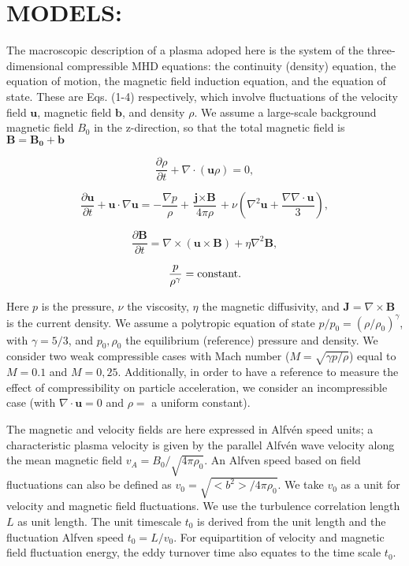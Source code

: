 \documentclass[%
aip,pop,amsmath,amssymb,
 reprint,%
]{revtex4-1}
\begin{document}
\section{\label{sec:level2}MODELS:}
The macroscopic description of a plasma adoped here
is the system of the three-dimensional compressible MHD equations: the continuity
(density) equation, the equation of motion, the magnetic field induction equation, and
the equation of state. These are Eqs. (1-4) respectively, which involve fluctuations  of the
velocity field $\textbf{u}$, magnetic field $\textbf{b}$, and density $\rho$. We assume
a large-scale background magnetic field $B_0$ in the z-direction, so that the total magnetic
field is $\mathbf{B = B_0 + b}$


\begin{equation}
 \frac{\partial \rho}{\partial t} + \nabla \cdot (\textbf{u}\rho) = 0,
\end{equation}

\begin{equation}
 \frac{\partial \textbf{u}}{\partial t} + \textbf{u} \cdot \nabla \textbf{u} = - \frac{\nabla p}{\rho} + \frac{\textbf{j} \times \textbf{B}}{4\pi\rho} 
 + \nu \left( \nabla^2 \textbf{u} +    \frac{\nabla \nabla \cdot \textbf{u} }{3} \right),
\end{equation}

\begin{equation}
\frac{\partial \textbf{B}}{\partial t} = \nabla \times (\textbf{u} \times \textbf{B}) + \eta \nabla^2 \textbf{B},
\end{equation}

\begin{equation}
 \frac{p}{\rho^{\gamma}} = {\rm constant}.
\end{equation}


Here $p$ is the pressure, $\nu$ the viscosity, $\eta$ the magnetic 
diffusivity, and
$\textbf{J}=\nabla \times \textbf{B} $ is the current density. 
We assume a polytropic 
equation of state $p/p_0= (\rho/\rho_0)^{\gamma}$, with $\gamma=5/3$, and
$p_0, \rho_0$ the equilibrium (reference) pressure and density. 
We consider two weak compressible cases with Mach number
($M= \sqrt{\gamma p/\rho}$) equal to $M=0.1$ and $M=0,25$. Additionally, 
in order to 
have a reference to measure the effect of compressibility on particle 
acceleration, we consider an
incompressible case (with $\nabla \cdot \textbf{u} = 0$ and $\rho=$
a uniform constant).

The magnetic and velocity fields are here expressed in Alfv\'en speed units; 
a characteristic 
plasma velocity is given by the parallel Alfv\'en wave velocity
along the mean magnetic 
field $v_A = B_0/\sqrt{4\pi\rho_0}$. An Alfven speed based on field 
fluctuations can also be defined as $v_0=\sqrt{<b^2>/4\pi\rho_0}$. 
We take $v_0$ as a unit for velocity and magnetic field fluctuations. We use the turbulence
correlation length $L$ as unit length. The unit timescale $t_0$
is derived from the unit length and the fluctuation Alfven speed $t_0=L/v_0$.
For equipartition of velocity and magnetic field fluctuation energy, 
the eddy turnover time also equates to the time scale $t_0$.
\end{document}
